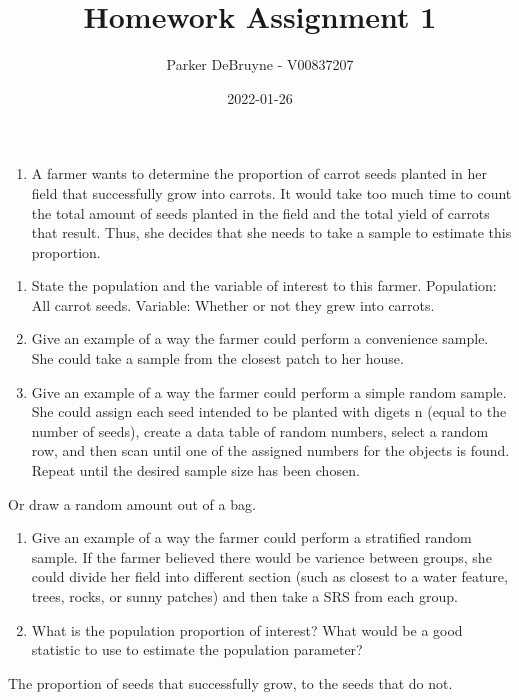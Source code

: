 \documentclass[]{article}
\title{Homework Assignment 1}
\author{Parker DeBruyne - V00837207}
\date{2022-01-26}
\providecommand{\tightlist}{%
  \setlength{\itemsep}{0pt}\setlength{\parskip}{0pt}}
\begin{document}
\maketitle

\begin{enumerate}
\def\labelenumi{\arabic{enumi}.}
\tightlist
\item
  A farmer wants to determine the proportion of carrot seeds planted in
  her field that successfully grow into carrots. It would take too much
  time to count the total amount of seeds planted in the field and the
  total yield of carrots that result. Thus, she decides that she needs
  to take a sample to estimate this proportion.
\end{enumerate}

\begin{enumerate}
\def\labelenumi{(\alph{enumi})}
\item
  State the population and the variable of interest to this farmer.
  Population: All carrot seeds. Variable: Whether or not they grew into
  carrots.
\item
  Give an example of a way the farmer could perform a convenience
  sample. She could take a sample from the closest patch to her house.
\item
  Give an example of a way the farmer could perform a simple random
  sample. She could assign each seed intended to be planted with digets
  n (equal to the number of seeds), create a data table of random
  numbers, select a random row, and then scan until one of the assigned
  numbers for the objects is found. Repeat until the desired sample size
  has been chosen.
\end{enumerate}

Or draw a random amount out of a bag.

\begin{enumerate}
\def\labelenumi{(\alph{enumi})}
\setcounter{enumi}{3}
\item
  Give an example of a way the farmer could perform a stratified random
  sample. If the farmer believed there would be varience between groups,
  she could divide her field into different section (such as closest to
  a water feature, trees, rocks, or sunny patches) and then take a SRS
  from each group.
\item
  What is the population proportion of interest? What would be a good
  statistic to use to estimate the population parameter?
\end{enumerate}

The proportion of seeds that successfully grow, to the seeds that do
not.
\end{document}
